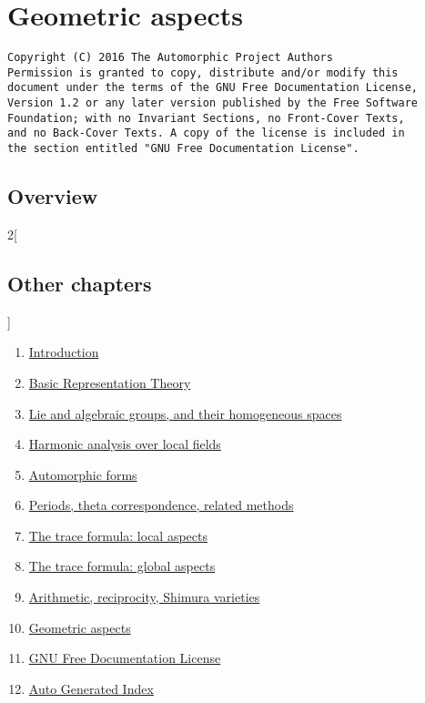 \documentclass[oneside]{stacks-project-book}
\theoremstyle{plain}
\theoremstyle{definition}
\theoremstyle{remark}
\numberwithin{equation}{subsection}
\begin{document}
%

\chapter{Geometric aspects}



\label{geometric-section-phantom}
\hypertarget{0900}{}
\reversemarginpar{}

\begin{verbatim}
Copyright (C) 2016 The Automorphic Project Authors
Permission is granted to copy, distribute and/or modify this
document under the terms of the GNU Free Documentation License,
Version 1.2 or any later version published by the Free Software
Foundation; with no Invariant Sections, no Front-Cover Texts,
and no Back-Cover Texts. A copy of the license is included in
the section entitled "GNU Free Documentation License".
\end{verbatim}



\section{Overview}
\label{geometric-section-overview}
\hypertarget{0901}{}
\reversemarginpar{}

\noindent




\begin{multicols}{2}[\section{Other chapters}]
\noindent
\begin{enumerate}
\item \hyperref[introduction-section-phantom]{Introduction}
\item \hyperref[representationtheory-section-phantom]{Basic Representation Theory}
\item \hyperref[algebraicgroups-section-phantom]{Lie and algebraic groups, and their homogeneous spaces}
\item \hyperref[harmonicanalysis-section-phantom]{Harmonic analysis over local fields}
\item \hyperref[automorphicforms-section-phantom]{Automorphic forms}
\item \hyperref[periods-section-phantom]{Periods, theta correspondence, related methods}
\item \hyperref[traceformulalocal-section-phantom]{The trace formula: local aspects}
\item \hyperref[traceformulaglobal-section-phantom]{The trace formula: global aspects}
\item \hyperref[arithmetic-section-phantom]{Arithmetic, reciprocity, Shimura varieties}
\item \hyperref[geometric-section-phantom]{Geometric aspects}
\item \hyperref[fdl-section-phantom]{GNU Free Documentation License}
\item \hyperref[index-section-phantom]{Auto Generated Index}
\end{enumerate}
\end{multicols}
\end{document}
